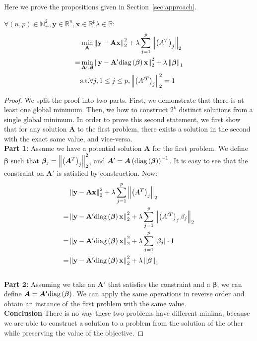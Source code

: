 Here we prove the propositions given in Section~\ref{sec:approach}.  
\begin{proposition}
\label{gps_equivalence}
  $\forall (n, p) \in \mathbb{N}_+^2, \bm{y} \in \mathbb{R}^{n}, \bm{x} \in \mathbb{R}^{p} \lambda \in \mathbb{R}$:
  \begin{align*}
    & \min_{\bf{A}} \left\lVert\bf{y} - \bf{A}\bf{x}\right\rVert_2^2 + \lambda \sum_{j=1}^p \left\lVert\left(A^T\right)_j\right\rVert_2 \\
     = &\min_{\bf{A'}, \bm{\beta}} \left\lVert\bf{y} - \bf{A'}\text{diag}\left(\bm{\beta}\right)\bf{x}\right\rVert_2^2 + \lambda \left\lVert\bm{\beta}\right\rVert_1 \\
     & \text{s.t.} \forall j, 1 \leq j \leq p, \left\lVert\left(A'^T\right)_j\right\rVert_2^2 = 1
  \end{align*}
\end{proposition}
\vspace{-.3in}
\begin{proof}
  We split the proof into two parts. First, we
  demonstrate that there is at least one global minimum. Then, we 
    how to construct $2^k$ distinct solutions from a single global
  minimum.
  In order to prove this second statement, we first show that for any solution $\bm{A}$ to the first problem, there exists a solution in the second with the exact same value, and vice-versa.
  \\ \textbf{Part 1:} Assume we have a potential solution $\bm{A}$ for the first problem.  We define $\bm{\beta}$ such that $\bm{\beta}_j = \left\lVert\left(\bm{A}^T\right)_j\right\rVert_2^2$, and $\bm{A}' = \bm{A}\left(\text{diag}\left(\bm{\beta}\right)\right)^{-1}$. It is easy to see that the constraint on $\bm{A}'$ is satisfied by construction. Now:
  \begin{align*}
    & \left\lVert\bf{y} - \bf{A}\bf{x}\right\rVert_2^2 + \lambda \sum_{j=1}^p \left\lVert\left(A^T\right)_j\right\rVert_2 \\
    = &\left\lVert\bf{y} - \bf{A'}\text{diag}\left(\bm{\beta}\right)\bf{x}\right\rVert_2^2 + \lambda \sum_{j=1}^p \left\lVert\left(A'^T\right)_j\beta_j\right\rVert_2 \\
    = &\left\lVert\bf{y} - \bf{A'}\text{diag}\left(\bm{\beta}\right)\bf{x}\right\rVert_2^2 + \lambda \sum_{j=1}^p \left|\beta_j\right| \cdot 1\\
    = &\left\lVert\bf{y} - \bf{A'}\text{diag}\left(\bm{\beta}\right)\bf{x}\right\rVert_2^2 + \lambda \left\lVert\bm{\beta}\right\rVert_1
  \end{align*}
  \\ \textbf{Part 2:} Assuming we take an $\bm{A}'$ that satisfies the constraint and a $\bm{\beta}$, we can define $\bm{A} = \bm{A'}\text{diag}\left(\bm{\beta}\right)$. We can apply the same operations in reverse order and obtain an instance of the first problem with the same value.
  \\ \textbf{Conclusion} There is no way these two problems have different minima,
  because we are able to construct a solution to a problem from the solution
  of the other while preserving the value of the objective.
\end{proof}

